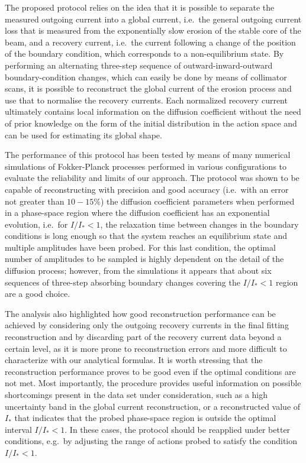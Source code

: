 {The proposed protocol relies on the idea that it is possible to separate the measured outgoing current into a global current, i.e.\ the general outgoing current loss that is measured from the exponentially slow erosion of the stable core of the beam, and a recovery current, i.e.\ the current following a change of the position of the boundary condition, which corresponds to a non-equilibrium state. By performing an alternating three-step sequence of outward-inward-outward boundary-condition changes, which can easily be done by means of collimator scans, it is possible to reconstruct the global current of the erosion process and use that to normalise the recovery currents. Each normalized recovery current ultimately contains local information on the diffusion coefficient without the need of prior knowledge on the form of the initial distribution in the action space and can be used for estimating its global shape.

The performance of this protocol has been tested by means of many numerical simulations of Fokker-Planck processes performed in various configurations to evaluate the reliability and limits of our approach. The protocol was shown to be capable of reconstructing with precision and good accuracy {(i.e.\ with an error not greater than $10-15\%$)} the diffusion coefficient parameters when performed in a phase-space region where the diffusion coefficient has an exponential evolution, i.e.\ for $I/I_\ast < 1$, the relaxation time between changes in the boundary conditions is long enough so that the system reaches an equilibrium state and multiple amplitudes have been probed. For this last condition, the optimal number of amplitudes to be sampled is highly dependent on the detail of the diffusion process; however, from the simulations it appears that about six sequences of three-step absorbing boundary changes covering the $I / I_\ast < 1$ region are a good choice. 

The analysis also highlighted how good reconstruction performance can be achieved by considering only the outgoing recovery currents in the final fitting reconstruction and by discarding part of the recovery current data beyond a certain level, as it is more prone to reconstruction errors and more difficult to characterize with our analytical formulas. It is worth stressing that the reconstruction performance proves to be good even if the optimal conditions are not met. Most importantly, the procedure provides useful information on possible shortcomings present in the data set under consideration, such as a high uncertainty band in the global current reconstruction, or a reconstructed value of $I_\ast$ that indicates that the probed phase-space region is outside the optimal interval $I / I_\ast < 1$. In these cases, the protocol should be reapplied under better conditions, e.g.\ by adjusting the range of actions probed to satisfy the condition $I / I_\ast < 1$.

}
